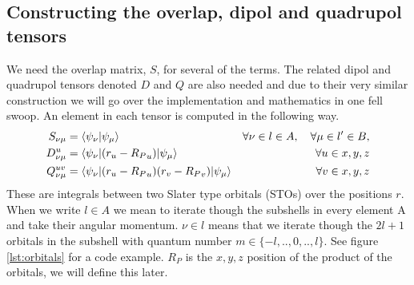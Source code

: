 \subsection{Constructing the overlap, dipol and quadrupol tensors}
We need the overlap matrix, $S$, for several of the terms.
The related dipol and quadrupol tensors denoted $D$ and $Q$ are also needed and due to their very similar construction we will go over the implementation and mathematics in one fell swoop. 
An element in each tensor is computed in the following way.
\begin{align}
    S_{\nu\mu} &= \braket{\psi_\nu|\psi_\mu} &\forall \nu \in l \in A,\quad\forall\mu \in l' \in B, \\
    D_{\nu\mu}^{u} &= \braket{\psi_\nu|(r_u-{R_P}_u)|\psi_\mu}  &\forall  u\in x,y,z\\
    Q_{\nu\mu}^{uv} &= \braket{\psi_\nu|(r_u-{R_P}_u)(r_v-{R_P}_v)|\psi_\mu} &\forall  v\in x,y,z
\end{align}
These are integrals between two Slater type orbitals (STOs) over the positions $r$. When we write $l \in A$ we mean to iterate though the subshells in every element A and take their angular momentum. $\nu\in l$ means that we iterate though the $2l+1$ orbitals in the subshell with quantum number $m\in\{-l,..,0,..,l\}$. See figure \ref{lst:orbitals} for a code example. ${R_P}$ is the $x,y,z$ position of the product of the orbitals, we will define this later.

